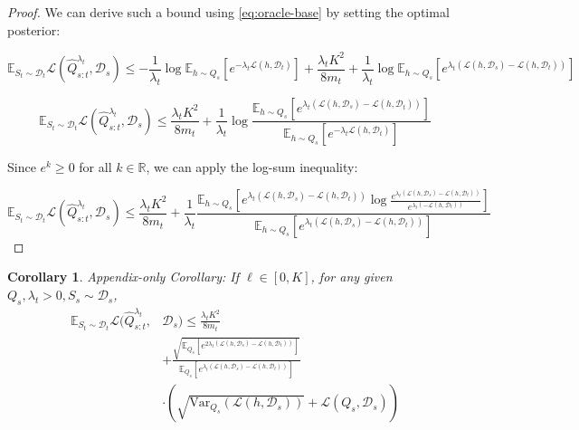 \documentclass{article}
\theoremstyle{plain}
\newtheorem{corollary}[theorem]{Corollary}
\theoremstyle{definition}
\theoremstyle{remark}
\begin{document}
\begin{proof}
We can derive such a bound using \eqref{eq:oracle-base} by setting the optimal posterior:

\begin{equation} 
\mathbb{E}_{S_t\sim \mathcal{D}_t}\mathcal{L}( \hat{Q}^{\lambda_t}_{s:t},\mathcal{D}_s)\leq -\frac{1}{\lambda_t}\log \mathbb{E}_{h\sim Q_s}\left [e^{-\lambda_t\mathcal{L}(h,\mathcal{D}_t)}\right ]+\frac{\lambda_t K^2}{8m_t}+\frac{1}{\lambda_t}\log\mathbb{E}_{h\sim Q_s}\left [e^{\lambda_t(\mathcal{L}(h,\mathcal{D}_s)-\mathcal{L}(h,\mathcal{D}_t))} \right ]
\end{equation}

$$
\mathbb{E}_{S_t\sim \mathcal{D}_t}\mathcal{L}( \hat{Q}^{\lambda_t}_{s:t},\mathcal{D}_s)\leq \frac{\lambda_t K^2}{8m_t}+\frac{1}{\lambda_t}\log\frac{\mathbb{E}_{h\sim Q_s}\left [e^{\lambda_t(\mathcal{L}(h,\mathcal{D}_s)-\mathcal{L}(h,\mathcal{D}_t))} \right ]}{\mathbb{E}_{h\sim Q_s}\left [e^{-\lambda_t\mathcal{L}(h,\mathcal{D}_t)}\right ]}
$$

Since $e^k\geq 0$ for all $k\in \mathbb{R}$, we can apply the log-sum inequality:

$$
\mathbb{E}_{S_t\sim \mathcal{D}_t}\mathcal{L}( \hat{Q}^{\lambda_t}_{s:t},\mathcal{D}_s)\leq \frac{\lambda_t K^2}{8m_t}+\frac{1}{\lambda_t}\frac{\mathbb{E}_{h\sim Q_s}\left [e^{\lambda_t(\mathcal{L}(h,\mathcal{D}_s)-\mathcal{L}(h,\mathcal{D}_t))}\log\frac{e^{\lambda_t(\mathcal{L}(h,\mathcal{D}_s)-\mathcal{L}(h,\mathcal{D}_t))}}{e^{\lambda_t(-\mathcal{L}(h,\mathcal{D}_t))}} \right ]}{\mathbb{E}_{h\sim Q_s}\left [e^{\lambda_t(\mathcal{L}(h,\mathcal{D}_s)-\mathcal{L}(h,\mathcal{D}_t))}\right ]}
$$
\end{proof}


\begin{corollary} %
\label{corollary:appendix}
Appendix-only Corollary:
If $\ell\in[0,K]$, for any given $Q_s, \lambda_t>0, S_s\sim \mathcal{D}_s$,  
%
\begin{equation} \label{eq:oracle-final}
\begin{split}
\mathbb{E}_{S_t\sim \mathcal{D}_t}\mathcal{L}( \hat{Q}^{\lambda_t}_{s:t},&\mathcal{D}_s)\leq \frac{\lambda_t K^2}{8m_t}\\&+\frac{\sqrt{\mathbb{E}_{Q_s}\left [e^{2\lambda_t(\mathcal{L}(h,\mathcal{D}_s)-\mathcal{L}(h,\mathcal{D}_t))}\right ]}}{\mathbb{E}_{Q_s}\left [e^{\lambda_t(\mathcal{L}(h,\mathcal{D}_s)-\mathcal{L}(h,\mathcal{D}_t))}\right ]}\\
&\cdot \left (\sqrt{\mathrm{Var}_{Q_s}(\mathcal{L}(h,\mathcal{D}_s))}+\mathcal{L}(Q_s,\mathcal{D}_s)\right )
\end{split}
\end{equation}
\end{corollary}
\end{document}
